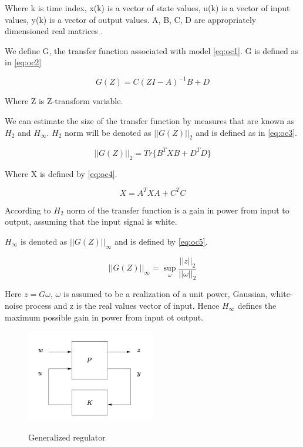 \documentclass[12pt,a4paper]{report}
\begin{document}
			Where k is time index, x(k) is a vector of state values, u(k) is a vector of input values, y(k) is a vector of output values. A, B, C, D are  appropriately dimensioned real matrices \cite{hazell2008discrete}.
			
			We define G, the  transfer function associated with model \ref{eq:oc1}. G is defined as in \ref{eq:oc2}
			
			\begin{equation}\label{eq:oc2}
				G(Z) = C(ZI - A)^{-1}B+D
			\end{equation}
			
			Where Z is Z-transform variable.
			
			We can estimate the size of the transfer function by measures that are known as $H_2$ and $H_\infty$. $H_2$ norm will be denoted as $||G(Z)||_2$ and is defined as in \ref{eq:oc3}.
			
			\begin{equation}\label{eq:oc3}
				||G(Z)||_2 = Tr\{ B^{T} XB + D^{T} D \}
			\end{equation}
			
			Where X is defined by \ref{eq:oc4}.
			
			\begin{equation}\label{eq:oc4}
				X = A^{T} XA + C^{T} C
			\end{equation}
			
			According to \cite{hazell2008discrete} 	$H_2$ norm of the transfer function is a gain in power from input to output, assuming that the input signal is white.  
			
			$H_\infty$ is denoted as $||G(Z)||_\infty$ and is defined by \ref{eq:oc5}.		
			
			\begin{equation}\label{eq:oc5}
				||G(Z)||_\infty = \sup_{\omega} \dfrac{||z||_2}{||\omega||_2}
			\end{equation}
			
			Here $z = G\omega$, $\omega$ is assumed to be a realization of a unit power, Gaussian, white-noise process and z is the real values vector of input. Hence $H_\infty$ defines the maximum possible gain in power from input ot output.
			
			\begin{figure}[h!]
				\vspace{-0.2cm}
				\centering
				{\includegraphics[width=0.5\textwidth]{11}}
				\caption{Generalized regulator \cite{hazell2008discrete}}
				\label{fig:11}
				\vspace{-0.1cm}
			\end{figure}
			
\end{document}
